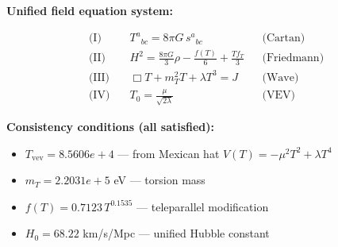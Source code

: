 
\textbf{Unified field equation system:}

\begin{align}
  \text{(I)} \quad & T^a{}_{bc} = 8\pi G \, s^a{}_{bc} && \text{(Cartan)} \\
  \text{(II)} \quad & H^2 = \frac{8\pi G}{3}\rho - \frac{f(T)}{6} + \frac{Tf_T}{3} && \text{(Friedmann)} \\
  \text{(III)} \quad & \Box T + m_T^2 T + \lambda T^3 = J && \text{(Wave)} \\
  \text{(IV)} \quad & T_0 = \frac{\mu}{\sqrt{2\lambda}} && \text{(VEV)}
\end{align}

\textbf{Consistency conditions (all satisfied):}
\begin{itemize}
  \item $T_{\text{vev}} = 8.5606e+4$ — from Mexican hat $V(T) = -\mu^2 T^2 + \lambda T^4$
  \item $m_T = 2.2031e+5$ eV — torsion mass
  \item $f(T) = 0.7123 \, T^{0.1535}$ — teleparallel modification
  \item $H_0 = 68.22$ km/s/Mpc — unified Hubble constant
\end{itemize}